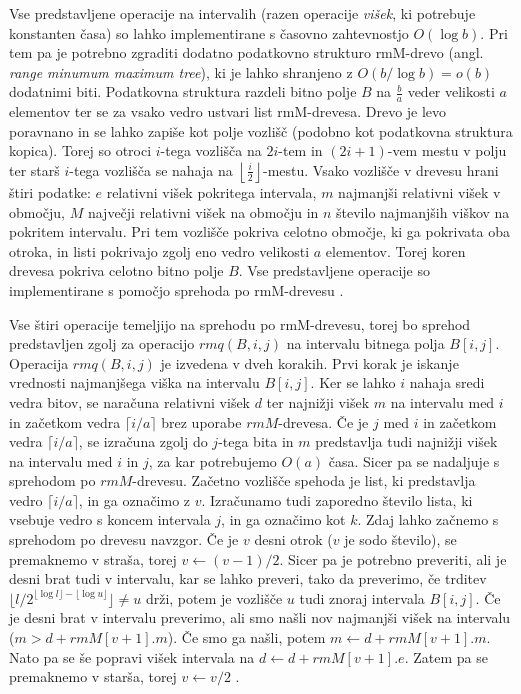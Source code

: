 Vse predstavljene operacije na intervalih (razen operacije \textit{višek}, ki potrebuje konstanten časa) so lahko implementirane s časovno zahtevnostjo $O(\log{b})$. Pri tem pa je potrebno zgraditi dodatno podatkovno strukturo rmM-drevo (angl. \textit{range minumum maximum tree}), ki je lahko shranjeno z $O(b/\log{b})=o(b)$ dodatnimi biti. Podatkovna struktura razdeli bitno polje $B$ na $\frac{b}{a}$ veder velikosti $a$ elementov ter se za vsako vedro ustvari list rmM-drevesa. Drevo je levo poravnano in se lahko zapiše kot polje vozlišč (podobno kot podatkovna struktura kopica). Torej so otroci $i$-tega vozlišča na $2i$-tem in $(2i+1)$-vem mestu v polju ter starš $i$-tega vozlišča se nahaja na $\left\lfloor\frac{i}{2}\right\rfloor$-mestu. Vsako vozlišče v drevesu hrani štiri podatke: $e$ relativni višek pokritega intervala, $m$ najmanjši relativni višek v območju, $M$ največji relativni višek na območju in $n$ število najmanjših viškov na pokritem intervalu. Pri tem vozlišče pokriva celotno območje, ki ga pokrivata oba otroka, in listi pokrivajo zgolj eno vedro velikosti $a$ elementov. Torej koren drevesa pokriva celotno bitno polje $B$. Vse predstavljene operacije so implementirane s pomočjo sprehoda po rmM-drevesu \cite{Navarro2016}.

Vse štiri operacije temeljijo na sprehodu po rmM-drevesu, torej bo sprehod predstavljen zgolj za operacijo $rmq(B,i,j)$ na intervalu bitnega polja $B[i,j]$. Operacija $rmq(B,i,j)$ je izvedena v dveh korakih. Prvi korak je iskanje vrednosti najmanjšega viška na intervalu $B[i,j]$. Ker se lahko $i$ nahaja sredi vedra bitov, se naračuna relativni višek $d$ ter najnižji višek $m$ na intervalu med $i$ in začetkom vedra $\lceil i/a\rceil$ brez uporabe $rmM$-drevesa. Če je $j$ med $i$ in začetkom vedra  $\lceil i/a\rceil$, se izračuna zgolj do $j$-tega bita in $m$ predstavlja tudi najnižji višek na intervalu med $i$ in $j$, za kar potrebujemo $O(a)$ časa. Sicer pa se nadaljuje s sprehodom po $rmM$-drevesu. Začetno vozlišče spehoda je list, ki predstavlja vedro  $\lceil i/a\rceil$, in ga označimo z $v$. Izračunamo tudi zaporedno število lista, ki vsebuje vedro s koncem intervala $j$, in ga označimo kot $k$. Zdaj lahko začnemo s sprehodom po drevesu navzgor. Če je $v$ desni otrok ($v$ je sodo število), se premaknemo v straša, torej $v\leftarrow (v-1)/2$. Sicer pa je potrebno preveriti, ali je desni brat tudi v intervalu, kar se lahko preveri, tako da preverimo, če trditev $\lfloor l/2^{\lfloor \log l\rfloor- \lfloor \log u \rfloor}\rfloor\ne u$ drži, potem je vozlišče $u$ tudi znoraj intervala $B[i,j]$. Če je desni brat v intervalu preverimo, ali smo našli nov najmanjši višek na intervalu ($m>d+rmM[v+1].m$). Če smo ga našli, potem $m\leftarrow d+rmM[v+1].m$. Nato pa se še popravi višek intervala na $d\leftarrow d+rmM[v+1].e$. Zatem pa se premaknemo v starša, torej $v\leftarrow v/2$ \cite{Navarro2016}.

